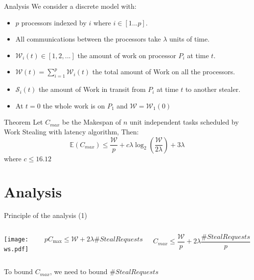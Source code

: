 \documentclass{beamer}
\begin{document}
\begin{frame}{Analysis}
    We consider a discrete model with: 
    \begin{itemize}
        \item $p$ processors indexed by $i$ where  $i \in [1...p]$.
        \item All communications between the processors take $\lambda$ units of time.
        \item $\mathcal{W}_i(t) \in [1,2,...]$ the amount of work on processor $P_i$ at time $t$.
        \item $\mathcal{W}(t) = \sum_{i=1}^{p} \mathcal{W}_i(t)$ the total amount of Work on all the processors. 
        \item $\mathcal{S}_i(t)$ the amount of Work in transit from $P_i$ at time $t$ to another stealer. 
        \item At $t=0$ the whole work is on $P_1$ and $\mathcal{W} = \mathcal{W}_1(0)$ 
    \end{itemize}
    \bigskip
    
    \begin{block}{Theorem}
        Let $C_{max}$ be the Makespan of $n$ unit independent tasks scheduled by Work Stealing with latency algorithm, Then:
        \begin{equation*}   
            \mathbb{E}(C_{max}) \leq \frac{\mathcal{W}}{p} +  c\lambda\log_2(\frac{\mathcal{W}}{2\lambda}) + 3\lambda
        \end{equation*}             where $c \leq 16.12$ 
    \end{block}
\end{frame}

\section{Analysis}
\begin{frame}{Principle of the analysis (1)}
    \begin{columns} 
        \begin{center}
            \texttt{[image: ws.pdf]}
        \end{center}
        \begin{center} 
            $pC_{\max} \le \mathcal{W} + 2\lambda\#\textit{StealRequests}$
        \end{center} 
        \begin{equation}
            C_{max}  \leq \frac{\mathcal{W}}{p} + 2\lambda\frac{\#StealRequests}{p}
        \end{equation} 
    \end{columns} 
    \begin{center}
    To bound \alert{$C_{max}$}, we need to bound \alert{$\#StealRequests$}
    \end{center}
\end{frame}
\end{document}
